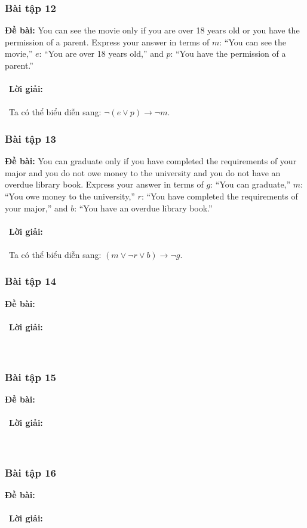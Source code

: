 \documentclass[a4paper]{article}
\begin{document}
\subsubsection{Bài tập 12}
\textbf{Đề bài:} You can see the movie only if you are over 18 years old or you have the permission of a parent. Express your answer in terms of $m$: “You can see the movie,” $e$: “You are over 18 years old,” and $p$: “You have the permission of a parent.” \\\ \\\
\textbf{Lời giải:} \\\ \\\
Ta có thể biểu diễn sang: $\lnot (e \lor p) \rightarrow \lnot m$.
\clearpage
\subsubsection{Bài tập 13}
\textbf{Đề bài:} You can graduate only if you have completed the requirements of your major and you do not owe money to the university and you do not have an overdue library book. Express your answer in terms of
$g$: “You can graduate,” $m$: “You owe money to the university,” $r$: “You have completed the requirements
of your major,” and $b$: “You have an overdue library book.” \\\ \\\
\textbf{Lời giải:} \\\ \\\
Ta có thể biểu diễn sang: $(m \lor \lnot r \lor b) \rightarrow \lnot g$.
\clearpage
\subsubsection{Bài tập 14}
\textbf{Đề bài:} 
\\\ \\\
\textbf{Lời giải:} \\\ \\\
\clearpage
\subsubsection{Bài tập 15}
\textbf{Đề bài:} 
\\\ \\\
\textbf{Lời giải:} \\\ \\\
\clearpage
\subsubsection{Bài tập 16}
\textbf{Đề bài:} 
\\\ \\\
\textbf{Lời giải:} \\\ \\\
\clearpage
\end{document}
